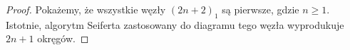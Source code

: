 \begin{proof}
    Pokażemy, że wszystkie węzły $(2n+2)_1$ są pierwsze, gdzie $n \ge 1$.
    Istotnie, algorytm Seiferta zastosowany do diagramu tego węzła wyprodukuje $2n+1$ okręgów.
\begin{comment}
    \[
        \begin{tikzpicture}[baseline=-0.65ex,scale=0.06]
        \begin{knot}[clip width=7, flip crossing/.list={1,4,5},end tolerance=1pt]
            \node at (0,10) {$\cdots$};
            \strand[semithick] (-30, -5) -- (-5, -5);
            \strand[semithick]  (5, -5) -- (30, -5);
            \strand[semithick,latex-]  (-30,-15) -- (-5,-15);
            \strand[semithick]  (5,-15) -- (30,-15);

            \strand[semithick] (-5, -15) [in=down, out=right] to (5, -10) [in=right, out=up] to (-5, -5);
            \strand[semithick] (5, -15) [in=down, out=left] to (-5, -10) [in=left, out=up] to (5, -5);

            \strand[semithick] (-30, 15) to [out=left, in=up]   (-45, 0);
            \strand[semithick] (-30,-15) to [out=left, in=down] (-45, 0);
            \strand[semithick] (-30,  5) to [out=left, in=up]   (-35, 0);
            \strand[semithick] (-30, -5) to [out=left, in=down] (-35, 0);

            \strand[semithick] (30, 15) to [out=right, in=up]   (45,0);
            \strand[semithick] (30,-15) to [out=right, in=down] (45,0);
            \strand[semithick] (30,  5) to [out=right, in=up]   (35,0);
            \strand[semithick] (30, -5) to [out=right, in=down] (35,0);

            \strand[semithick] (-30, 15) [in=left, out=right] to (-20,  5);
            \strand[semithick] (-30,  5) [in=left, out=right] to (-20, 15);
            \strand[semithick] (-10, 15) [in=right, out=left] to (-20,  5);
            \strand[semithick] (-10,  5) [in=right, out=left] to (-20, 15);

            \strand[semithick] (30, 15) [in=right, out=left] to (20,  5);
            \strand[semithick] (10, 15) [in=left, out=right] to (20,  5);
            \strand[semithick] (30,  5) [in=right, out=left] to (20, 15);
            \strand[semithick] (10,  5) [in=left, out=right] to (20, 15);
        \end{knot}
        \end{tikzpicture}
        \longrightarrow
        \begin{tikzpicture}[baseline=-0.65ex,scale=0.055]
            \node at (0,10) {$\cdots$};
            \draw[semithick] (-30,  -5) -- (30, -5);
            \draw[semithick] (-30, -15) -- (30,-15);


\end{comment}
\end{proof}
